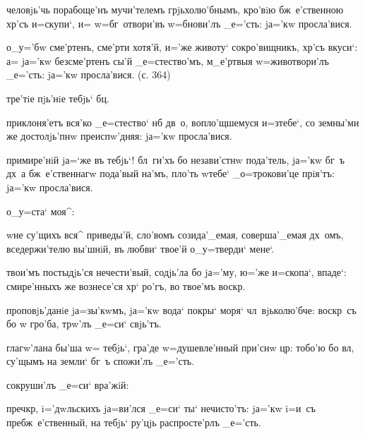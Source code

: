 {{ человjь'чь порабоще'нъ мучи'телемъ 
грjьхолю'бнымъ, кро'вiю бж~е'ственною хр'съ и=скупи`, 
и= w=бг~отвори'въ w=бнови'лъ _е='сть: jа='кw просла'вися.

 о_у='бw сме'ртенъ, сме'рти хотя'й, и='же 
животу` сокро'вищникъ, хр'съ вкуси`: а= jа='кw 
безсме'ртенъ сы'й _е=стество'мъ, м_е'ртвыя w=животвори'лъ 
_е='сть: jа='кw просла'вися. (с. 364)

    \kinovarsimple{[_е=гw'же}   тре'тiе пjь'нiе тебjь` бц.\kinovarsimple{] 
Гла'съ г~.}



 приклоня'етъ вся'ко _е=стество` нб 
дв~о, вопло'щшемуся и=з\ъ тебе`, со земны'ми же 
достолjь'пнw преиспw'дняя: jа='кw просла'вися.

 примире'нiй jа=`же въ тебjь`! бл~ги'хъ бо 
незави'стнw пода'тель, jа='кw бг~ъ дх~а бж~е'ственнагw 
пода'вый на'мъ, пло'ть w\т тебе` _о=трокови'це прiя'тъ: 
jа='кw просла'вися.

  о_у=ста` моя^:


  w\т не су'щихъ вся^ приведы'й, 
сло'вомъ созида'_емая, соверша'_емая дх~омъ, 
вседержи'телю вы'шнiй, въ любви` твое'й о_у=тверди` 
мене`.

 твои'мъ постыдjь'ся нечести'вый, 
содjь'ла бо jа='му, ю='же и=скопа`, впаде`: смире'нныхъ 
же вознесе'ся хр` ро'гъ, во твое'мъ воскр.

 проповjь'данiе jа=зы'кwмъ, jа='кw 
вода` покры` моря` чл~вjьколю'бче: воскр~съ бо w\т 
гро'ба, тр w'лъ _е=си` свjь'тъ.

  глагw'лана бы'ша w= 
тебjь`, гра'де w=душевле'нный при'снw цр: 
тобо'ю бо вл, су'щымъ на земли` бг~ъ спожи'лъ 
_е='сть.

   сокруши'лъ _е=си` вра'жiй:

 преч кр, i='дwльскихъ 
jа=ви'лся _е=си` ты` нечисто'тъ: jа='кw i=и~съ 
пребж~е'ственный, на тебjь` ру'цjь распросте'рлъ _е='сть.

}}
